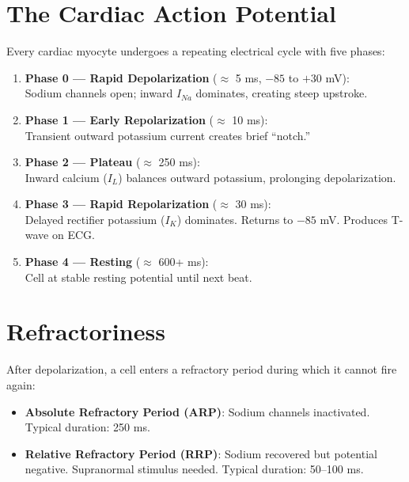 \documentclass[12pt,oneside,a4paper]{book}
\begin{document}
\section{The Cardiac Action Potential}

Every cardiac myocyte undergoes a repeating electrical cycle with five phases:

\begin{enumerate}
  \item \textbf{Phase 0 --- Rapid Depolarization} ($\approx$ 5 ms, $-85$ to $+30$ mV):\\
    Sodium channels open; inward $I_{Na}$ dominates, creating steep upstroke.

  \item \textbf{Phase 1 --- Early Repolarization} ($\approx$ 10 ms):\\
    Transient outward potassium current creates brief ``notch.''

  \item \textbf{Phase 2 --- Plateau} ($\approx$ 250 ms):\\
    Inward calcium ($I_L$) balances outward potassium, prolonging depolarization.

  \item \textbf{Phase 3 --- Rapid Repolarization} ($\approx$ 30 ms):\\
    Delayed rectifier potassium ($I_K$) dominates. Returns to $-85$ mV. Produces T-wave on ECG.

  \item \textbf{Phase 4 --- Resting} ($\approx$ 600+ ms):\\
    Cell at stable resting potential until next beat.
\end{enumerate}

\section{Refractoriness}

After depolarization, a cell enters a refractory period during which it cannot fire again:

\begin{itemize}
  \item \textbf{Absolute Refractory Period (ARP)}: Sodium channels inactivated. Typical duration: 250 ms.
  \item \textbf{Relative Refractory Period (RRP)}: Sodium recovered but potential negative. Supranormal stimulus needed. Typical duration: 50--100 ms.
\end{itemize}
\end{document}

